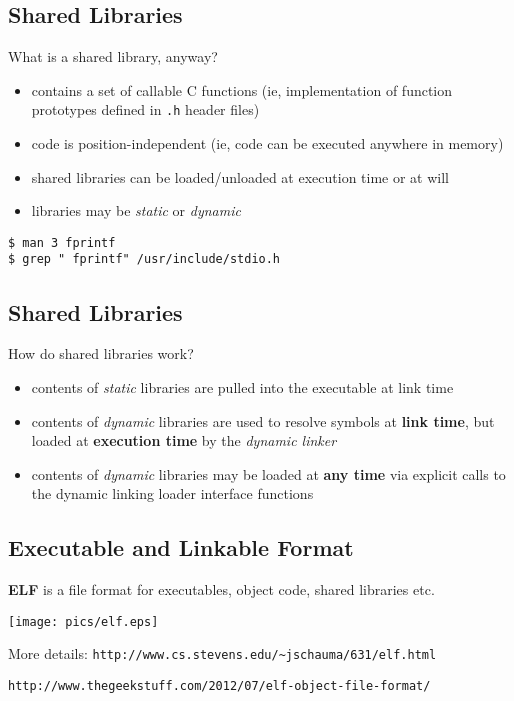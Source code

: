 \documentclass[xga]{xdvislides}
\begin{document}
\subsection{Shared Libraries}
What is a shared library, anyway?
\begin{itemize}
	\item contains a set of callable C functions (ie, implementation
		of function prototypes defined in {\tt .h} header files)
	\item code is position-independent (ie, code can be executed anywhere
		in memory)
	\item shared libraries can be loaded/unloaded at execution time or at will
	\item libraries may be {\em static} or {\em dynamic}
\end{itemize}
\begin{verbatim}
$ man 3 fprintf
$ grep " fprintf" /usr/include/stdio.h
\end{verbatim}


\subsection{Shared Libraries}
How do shared libraries work?
\begin{itemize}
	\item contents of {\em static} libraries are pulled into the
		executable at link time
	\item contents of {\em dynamic} libraries are used to resolve
		symbols at {\bf link time}, but loaded at {\bf execution time} by the
		{\em dynamic linker}
	\item contents of {\em dynamic} libraries may be loaded at {\bf any
		time} via explicit calls to the dynamic linking loader interface
		functions
\end{itemize}

\subsection{Executable and Linkable Format}

{\bf ELF} is a file format for executables, object code, shared libraries
etc.

\begin{center}
	\texttt{[image: pics/elf.eps]}
\end{center}
More details:
\verb+http://www.cs.stevens.edu/~jschauma/631/elf.html+

\verb+http://www.thegeekstuff.com/2012/07/elf-object-file-format/+
\Normalsize
\end{document}
